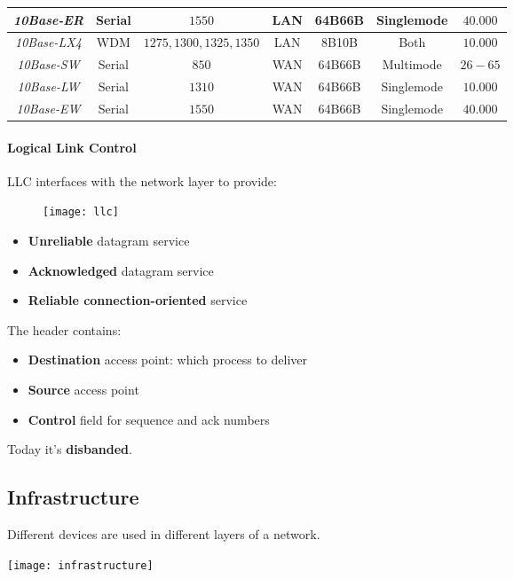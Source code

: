 \begin{itemize}
\begin{table}[!h]
\begin{tabular}{|c|c|c|c|c|c|c|}
			\hline
			\textit{10Base-ER} & Serial & $1550$ & LAN & 64B66B & Singlemode & $40.000$\\
			\hline
			\textit{10Base-LX4} & WDM\footnotemark& $1275, 1300, 1325, 1350$ & LAN & 8B10B & Both & $10.000$\\
			\hline
			\textit{10Base-SW} & Serial & $850$ & WAN & 64B66B & Multimode & $26-65$\\
			\hline
			\textit{10Base-LW} & Serial & $1310$ & WAN& 64B66B & Singlemode & $10.000$\\
			\hline
			\textit{10Base-EW} & Serial & $1550$ & WAN& 64B66B & Singlemode & $40.000$\\
			\hline
		\end{tabular}
	\end{table}
\end{itemize}

\paragraph{Logical Link Control} LLC interfaces with the network layer to provide:\\
\begin{wrapfigure}[5]{r}{5cm}
	\begin{center}
		\texttt{[image: llc]}
	\end{center}
\end{wrapfigure}
\begin{itemize}
	\item \textbf{Unreliable} datagram service
	\item \textbf{Acknowledged} datagram service
	\item \textbf{Reliable connection-oriented} service
\end{itemize}
The header contains:
\begin{itemize}
	\item \textbf{Destination} access point: which process to deliver
	\item \textbf{Source} access point
	\item \textbf{Control} field for sequence and ack numbers
\end{itemize}
Today it's \textbf{disbanded}.

\subsection{Infrastructure}
Different devices are used in different layers of a network.
\begin{center}
	\texttt{[image: infrastructure]}
\end{center}

